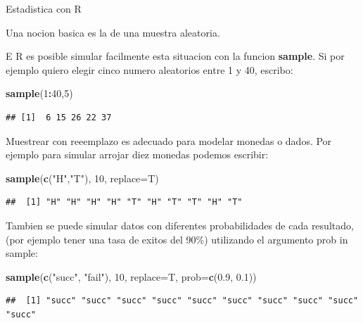\documentclass[ignorenonframetext,]{beamer}
\newenvironment{Shaded}{\begin{snugshade}}{\end{snugshade}}
\newcommand{\KeywordTok}[1]{\textcolor[rgb]{0.13,0.29,0.53}{\textbf{#1}}}
\newcommand{\DataTypeTok}[1]{\textcolor[rgb]{0.13,0.29,0.53}{#1}}
\newcommand{\DecValTok}[1]{\textcolor[rgb]{0.00,0.00,0.81}{#1}}
\newcommand{\FloatTok}[1]{\textcolor[rgb]{0.00,0.00,0.81}{#1}}
\newcommand{\StringTok}[1]{\textcolor[rgb]{0.31,0.60,0.02}{#1}}
\newcommand{\OperatorTok}[1]{\textcolor[rgb]{0.81,0.36,0.00}{\textbf{#1}}}
\newcommand{\NormalTok}[1]{#1}
\begin{document}
\begin{frame}[fragile]{Estadistica con R}

Una nocion basica es la de una muestra aleatoria.

E R es posible simular facilmente esta situacion con la funcion
\textbf{sample}. Si por ejemplo quiero elegir cinco numero aleatorios
entre 1 y 40, escribo:

\begin{Shaded}
\begin{Highlighting}[]
\KeywordTok{sample}\NormalTok{(}\DecValTok{1}\OperatorTok{:}\DecValTok{40}\NormalTok{,}\DecValTok{5}\NormalTok{)}
\end{Highlighting}
\end{Shaded}

\begin{verbatim}
## [1]  6 15 26 22 37
\end{verbatim}

Muestrear con reeemplazo es adecuado para modelar monedas o dados. Por
ejemplo para simular arrojar diez monedas podemos escribir:

\begin{Shaded}
\begin{Highlighting}[]
\KeywordTok{sample}\NormalTok{(}\KeywordTok{c}\NormalTok{(}\StringTok{"H"}\NormalTok{,}\StringTok{"T"}\NormalTok{), }\DecValTok{10}\NormalTok{, }\DataTypeTok{replace=}\NormalTok{T)}
\end{Highlighting}
\end{Shaded}

\begin{verbatim}
##  [1] "H" "H" "H" "H" "T" "H" "T" "T" "H" "T"
\end{verbatim}

Tambien se puede simular datos con diferentes probabilidades de cada
resultado, (por ejemplo tener una tasa de exitos del 90\%) utilizando el
argumento prob in sample:

\begin{Shaded}
\begin{Highlighting}[]
\KeywordTok{sample}\NormalTok{(}\KeywordTok{c}\NormalTok{(}\StringTok{"succ"}\NormalTok{, }\StringTok{"fail"}\NormalTok{), }\DecValTok{10}\NormalTok{, }\DataTypeTok{replace=}\NormalTok{T, }\DataTypeTok{prob=}\KeywordTok{c}\NormalTok{(}\FloatTok{0.9}\NormalTok{, }\FloatTok{0.1}\NormalTok{))}
\end{Highlighting}
\end{Shaded}

\begin{verbatim}
##  [1] "succ" "succ" "succ" "succ" "succ" "succ" "succ" "succ" "succ" "succ"
\end{verbatim}

\end{frame}
\end{document}
